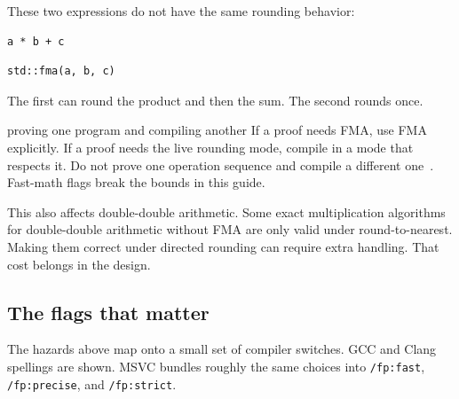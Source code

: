\documentclass[manuscript, nonacm]{acmart}
\begin{document}
    These two expressions do not have the same rounding behavior:
    \begin{lstlisting}[style=cpp]
a * b + c
    \end{lstlisting}
    \begin{lstlisting}[style=cpp]
std::fma(a, b, c)
    \end{lstlisting}

    The first can round the product and then the sum. The second rounds once.

    \begin{pitfall}{proving one program and compiling another}
        If a proof needs FMA, use FMA explicitly. If a proof needs the live
        rounding mode, compile in a mode that respects it. Do not prove one
        operation sequence and compile a different one~\cite{handbook}.
        Fast-math flags break the bounds in this guide.
    \end{pitfall}

    This also affects double-double arithmetic. Some exact multiplication
    algorithms for double-double arithmetic without FMA are only valid under
    round-to-nearest. Making them correct under directed rounding can require
    extra handling. That cost belongs in the design.

    \subsection{The flags that matter}

    The hazards above map onto a small set of compiler switches. GCC and
    Clang spellings are shown. MSVC bundles roughly the same choices into
    \texttt{/fp:fast}, \texttt{/fp:precise}, and \texttt{/fp:strict}.
\end{document}
